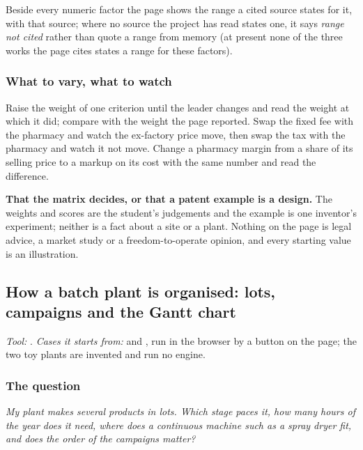 \documentclass[11pt,a4paper]{article}
\begin{document}
Beside every numeric factor the page shows the range a cited source states for
it, with that source; where no source the project has read states one, it
says \emph{range not cited} rather than quote a range from memory (at present
none of the three works the page cites states a range for these factors).

\subsubsection*{What to vary, what to watch}

\begin{tryit}
Raise the weight of one criterion until the leader changes and read the
weight at which it did; compare with the weight the page reported.  Swap the
fixed fee with the pharmacy and watch the ex-factory price move, then swap the
tax with the pharmacy and watch it not move.
Change a pharmacy margin from a share of its selling price to a markup on its
cost with the same number and read the difference.
\end{tryit}

\begin{pitfall}
\textbf{That the matrix decides, or that a patent example is a design.}  The
weights and scores are the student's judgements and the example is one
inventor's experiment; neither is a fact about a site or a plant.  Nothing on
the page is legal advice, a market study or a freedom-to-operate opinion, and
every starting value is an illustration.
\end{pitfall}

\subsection{How a batch plant is organised: lots, campaigns and the Gantt chart}\label{sec:edu-campaign-plan}

\noindent\textit{\small Tool:} .  \textit{\small
Cases it starts from:}  and
, run in the browser by a button
on the page; the two toy plants are invented and run no engine.

\subsubsection*{The question}

\emph{My plant makes several products in lots.  Which stage paces it, how many
hours of the year does it need, where does a continuous machine such as a spray
dryer fit, and does the order of the campaigns matter?}
\end{document}
